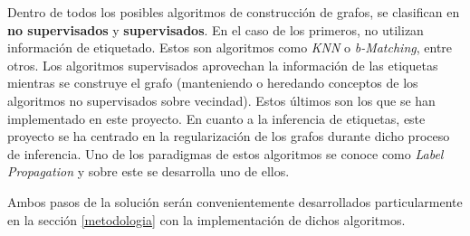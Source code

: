Dentro de todos los posibles algoritmos de construcción de grafos, se clasifican en \textbf{no supervisados} y \textbf{supervisados}. En el caso de los primeros, no utilizan información de etiquetado. Estos son algoritmos como \textit{KNN} o \textit{b-Matching}, entre otros. Los algoritmos supervisados aprovechan la información de las etiquetas mientras se construye el grafo (manteniendo o heredando conceptos de los algoritmos no supervisados sobre vecindad). Estos últimos son los que se han implementado en este proyecto. En cuanto a la inferencia de etiquetas, este proyecto se ha centrado en la regularización de los grafos durante dicho proceso de inferencia. Uno de los paradigmas de estos algoritmos se conoce como \textit{Label Propagation} y sobre este se desarrolla uno de ellos.

Ambos pasos de la solución serán convenientemente desarrollados particularmente en la sección \ref{metodologia} con la implementación de dichos algoritmos.